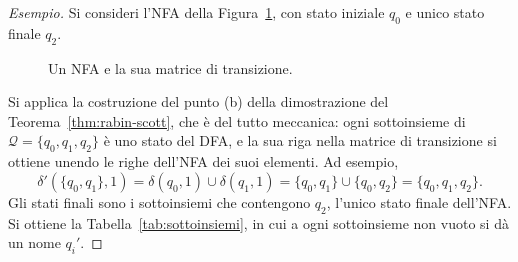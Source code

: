 \documentclass[a4paper, 11pt, oneside]{book}
\theoremstyle{formale}
\newenvironment{esempio}
    {\begin{proof}[\textit{Esempio}]\renewcommand{\qedsymbol}{$\diamond$}}
    {\end{proof}}
\begin{document}
    \begin{esempio}
        Si consideri l'NFA della Figura~\ref{fig:nfa-esempio}, con stato iniziale $q_0$ e
        unico stato finale $q_2$.

        \begin{figure}[H]
            \centering
            \caption{Un NFA e la sua matrice di transizione.}
            \label{fig:nfa-esempio}
        \end{figure}

        Si applica la costruzione del punto (b) della dimostrazione del
        Teorema~\ref{thm:rabin-scott}, che \`e del tutto meccanica:
        ogni sottoinsieme di $\mathcal{Q} = \{q_0, q_1, q_2\}$ \`e uno stato del DFA, e la
        sua riga nella matrice di transizione si ottiene unendo le righe dell'NFA dei suoi
        elementi. Ad esempio,
        \begin{equation*}
            \delta'(\{q_0, q_1\}, 1) = \delta(q_0, 1) \cup \delta(q_1, 1)
            = \{q_0, q_1\} \cup \{q_0, q_2\} = \{q_0, q_1, q_2\}.
        \end{equation*}
        Gli stati finali sono i sottoinsiemi che contengono $q_2$, l'unico stato finale
        dell'NFA. Si ottiene la Tabella~\ref{tab:sottoinsiemi}, in cui a ogni sottoinsieme
        non vuoto si d\`a un nome $q_i'$.


\end{esempio}
\end{document}
